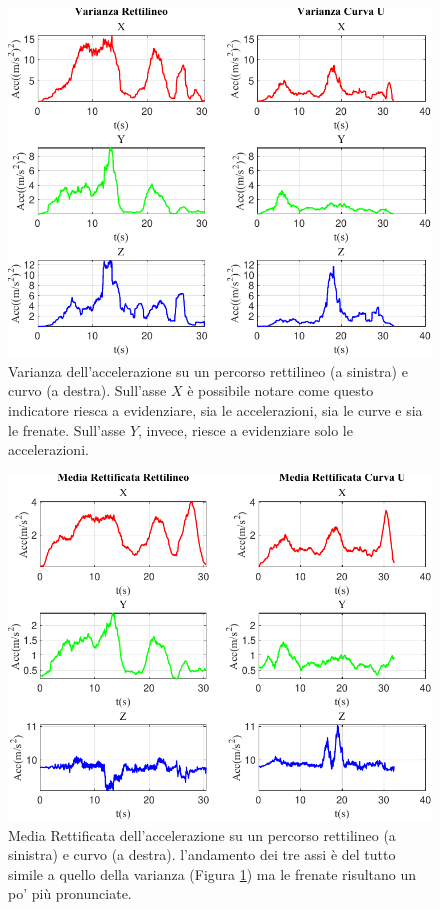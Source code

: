 \documentclass[class=article]{standalone}
\begin{document}
	\begin{center}
		\begin{figure}[h!]
			\centering\includegraphics[width=.7\textwidth]{img/LungaCurvaU/Acc/Varianza}
			\caption[]{Varianza dell'accelerazione su un percorso rettilineo (a sinistra) e curvo (a destra). Sull'asse \(X\) è possibile notare come questo indicatore riesca a evidenziare, sia le accelerazioni, sia le curve e sia le frenate. Sull'asse \(Y\), invece, riesce a evidenziare solo le accelerazioni.}
			\label{fig:AccVar_LungaCurvaU}
		\end{figure}
	\end{center}
	
	\begin{center}
		\begin{figure}[h!]
			\centering\includegraphics[width=.7\textwidth]{img/LungaCurvaU/Acc/Media Rettificata}
			\caption[]{Media Rettificata dell'accelerazione su un percorso rettilineo (a sinistra) e curvo (a destra). l'andamento dei tre assi è del tutto simile a quello della varianza (Figura \ref{fig:AccVar_LungaCurvaU}) ma le frenate risultano un po' più pronunciate.}
			\label{fig:AccRett_LungaCurvaU}
		\end{figure}
	\end{center}
	
\end{document}
